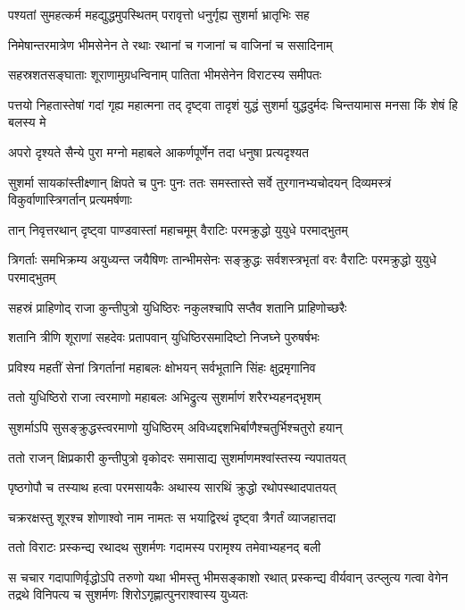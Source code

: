 \twolineshloka
{पश्यतां सुमहत्कर्म महद्युद्धमुपस्थितम्}
{परावृत्तो धनुर्गृह्य सुशर्मा भ्रातृभिः सह}


\twolineshloka
{निमेषान्तरमात्रेण भीमसेनेन ते रथाः}
{रथानां च गजानां च वाजिनां च ससादिनाम्}


\twolineshloka
{सहस्रशतसङ्घाताः शूराणामुग्रधन्विनाम्}
{पातिता भीमसेनेन विराटस्य समीपतः}


\onelineshloka
{पत्तयो निहतास्तेषां गदां गृह्य महात्मना}
\twolineshloka
{तद् दृष्ट्वा तादृशं युद्धं सुशर्मा युद्धदुर्मदः}
{चिन्तयामास मनसा किं शेषं हि बलस्य मे}


\twolineshloka
{अपरो दृश्यते सैन्ये पुरा मग्नो महाबले}
{आकर्णपूर्णेन तदा धनुषा प्रत्यदृश्यत}


\onelineshloka
{सुशर्मा सायकांस्तीक्ष्णान् क्षिपते च पुनः पुनः}
\twolineshloka
{ततः समस्तास्ते सर्वे तुरगानभ्यचोदयन्}
{दिव्यमस्त्रं विकुर्वाणास्त्रिगर्तान् प्रत्यमर्षणाः}


\twolineshloka
{तान् निवृत्तरथान् दृष्ट्वा पाण्डवास्तां महाचमूम्}
{वैराटिः परमक्रुद्धो युयुधे परमाद्भुतम्}


\threelineshloka
{त्रिगर्ताः समभिक्रम्य अयुध्यन्त जयैषिणः}
{तान्भीमसेनः सङ्क्रुद्धः सर्वशस्त्रभृतां वरः}
{वैराटिः परमक्रुद्धो युयुधे परमाद्भुतम्}


\twolineshloka
{सहस्रं प्राहिणोद् राजा कुन्तीपुत्रो युधिष्ठिरः}
{नकुलश्चापि सप्तैव शतानि प्राहिणोच्छरैः}


\twolineshloka
{शतानि त्रीणि शूराणां सहदेवः प्रतापवान्}
{युधिष्ठिरसमादिष्टो निजघ्ने पुरुषर्षभः}


\twolineshloka
{प्रविश्य महतीं सेनां त्रिगर्तानां महाबलः}
{क्षोभयन् सर्वभूतानि सिंहः क्षुद्रमृगानिव}


\twolineshloka
{ततो युधिष्ठिरो राजा त्वरमाणो महाबलः}
{अभिद्रुत्य सुशर्माणं शरैरभ्यहनद्भृशम्}


\twolineshloka
{सुशर्माऽपि सुसङ्क्रुद्धस्त्वरमाणो युधिष्ठिरम्}
{अविध्यद्दशभिर्बाणैश्चतुर्भिश्चतुरो हयान्}


\twolineshloka
{ततो राजन् क्षिप्रकारी कुन्तीपुत्रो वृकोदरः}
{समासाद्य सुशर्माणमश्वांस्तस्य न्यपातयत्}


\twolineshloka
{पृष्ठगोपौ च तस्याथ हत्वा परमसायकैः}
{अथास्य सारथिं क्रुद्धो रथोपस्थादपातयत्}


\twolineshloka
{चक्ररक्षस्तु शूरश्च शोणाश्वो नाम नामतः}
{स भयाद्विरथं दृष्ट्वा त्रैगर्तं व्याजहात्तदा}


\twolineshloka
{ततो विराटः प्रस्कन्द्य रथादथ सुशर्मणः}
{गदामस्य परामृश्य तमेवाभ्यहनद् बली}


\onelineshloka
{स चचार गदापाणिर्वृद्धोऽपि तरुणो यथा}
\threelineshloka
{भीमस्तु भीमसङ्काशो रथात् प्रस्कन्द्य वीर्यवान्}
{उत्प्लुत्य गत्वा वेगेन तद्रथे विनिपत्य च}
{सुशर्मणः शिरोऽगृह्णात्पुनराश्वास्य युध्यतः}



